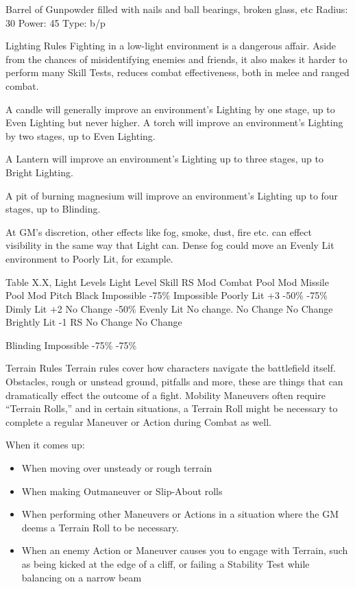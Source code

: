\documentclass[oneside,11pt,english]{book}
\begin{document}
Barrel of Gunpowder filled with nails and ball bearings, broken glass, etc 
Radius: 30 
Power: 45 
Type: b/p 

 

 

Lighting Rules 
Fighting in a low-light environment is a dangerous affair. Aside from the chances of misidentifying 
enemies and friends, it also makes it harder to perform many Skill Tests, reduces combat effectiveness, 
both in melee and ranged combat. 

 

A candle will generally improve an environment’s Lighting by one stage, up to Even Lighting but never 
higher. 
A torch will improve an environment’s Lighting by two stages, up to Even Lighting. 

 

A Lantern will improve an environment’s Lighting up to three stages, up to Bright Lighting. 

 

A pit of burning magnesium will improve an environment’s Lighting up to four stages, up to Blinding. 

 

At GM’s discretion, other effects like fog, smoke, dust, fire etc. can effect visibility in the same way that 
Light can. Dense fog could move an Evenly Lit environment to Poorly Lit, for example. 

 

Table X.X, Light Levels 
Light Level Skill RS Mod Combat Pool Mod Missile Pool Mod 
Pitch Black Impossible -75\% Impossible 
Poorly Lit +3 -50\% -75\% 
Dimly Lit +2 No Change -50\% 
Evenly Lit No change. No Change No Change 
Brightly Lit -1 RS No Change No Change 


Blinding Impossible -75\% -75\% 

 

 

Terrain Rules 
Terrain rules cover how characters navigate the battlefield itself. Obstacles, rough or unstead ground, 
pitfalls and more, these are things that can dramatically effect the outcome of a fight. Mobility Maneuvers 
often require “Terrain Rolls,” and in certain situations, a Terrain Roll might be necessary to complete a 
regular Maneuver or Action during Combat as well. 

 

When it comes up: 
\begin{itemize}
\item When moving over unsteady or rough terrain 
\item When making Outmaneuver or Slip-About rolls 
\item When performing other Maneuvers or Actions in a situation where the GM deems a Terrain Roll 
to be necessary. 
\item When an enemy Action or Maneuver causes you to engage with Terrain, such as being kicked at 
the edge of a cliff, or failing a Stability Test while balancing on a narrow beam 
\end{itemize}
 
\end{document}
